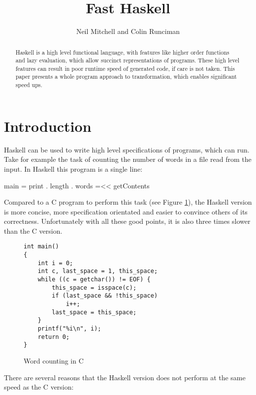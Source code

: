 \documentclass{llncs}
\begin{document}
\title{Fast Haskell}

\author{Neil Mitchell and Colin Runciman}


\maketitle              %

\begin{abstract}
Haskell is a high level functional language, with features like higher order functions and lazy evaluation, which allow succinct representations of programs. These high level features can result in poor runtime speed of generated code, if care is not taken. This paper presents a whole program approach to transformation, which enables significant speed ups.
\end{abstract}

\section{Introduction}

Haskell can be used to write high level specifications of programs, which can run. Take for example the task of counting the number of words in a file read from the input. In Haskell this program is a single line:

\begin{code}
main = print . length . words =<< getContents
\end{code}

Compared to a C program to perform this task (see Figure \ref{fig:c_words}), the Haskell version is more concise, more specification orientated and easier to convince others of its correctness. Unfortunately with all these good points,  it is also three times slower than the C version.

\begin{figure}[tb]
\begin{verbatim}
int main()
{
	int i = 0;
	int c, last_space = 1, this_space;
	while ((c = getchar()) != EOF) {
		this_space = isspace(c);
		if (last_space && !this_space)
			i++;
		last_space = this_space;
	}
	printf("%i\n", i);
	return 0;
}
\end{verbatim}
\caption{Word counting in C}
\label{fig:c_words}
\end{figure}

There are several reasons that the Haskell version does not perform at the same speed as the C version:
\end{document}
